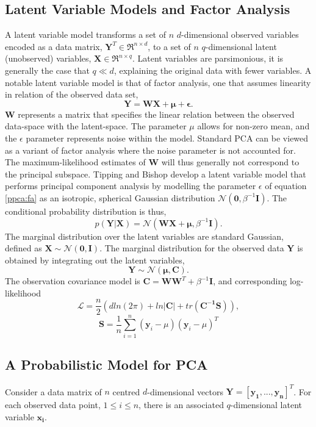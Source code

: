 \documentclass[ %
author={Dillon Keith Diep [INCOMPLETE DRAFT, NOT FOR SUBMISSION]},
supervisor={Dr. Carl Henrik Ek},
degree={MEng},
title={ARt-CG:},
subtitle={Assisted Real-time Content Generation of 3D Hair by Learning Manifolds},
type={Research},
year={2014} ]{dissertation}
\begin{document}
\subsection{Latent Variable Models and Factor Analysis}
A latent variable model transforms a set of $n$ $d$-dimensional observed variables encoded as a data matrix, $\bm{Y}^T\in\Re^{n \times d}$, to a set of $n$ $q$-dimensional latent (unobserved) variables, $\bm{X}\in\Re^{n \times q}$. Latent variables are parsimonious, it is generally the case that $q \ll d$, explaining the original data with fewer variables. A notable latent variable model is that of factor analysis, one that assumes linearity in relation of the observed data set,
\begin{equation} \label{ppca:fa}
\bm{Y=WX+\mu+\epsilon}.
\end{equation}
$\bm{W}$ represents a matrix that specifies the linear relation between the observed data-space with the latent-space.
The parameter $\mu$ allows for non-zero mean, and the $\epsilon$ parameter represents noise within the model. Standard PCA can be viewed as a variant of factor analysis where the noise parameter is not accounted for. The maximum-likelihood estimates of $\bm{W}$ will thus generally not correspond to the principal subspace. Tipping and Bishop develop a latent variable model that performs principal component analysis by modelling the parameter $\epsilon$ of equation \ref{ppca:fa} as an isotropic, spherical Gaussian distribution $\mathcal{N}(\bm{0},\beta^{-1}\bm{I})$. The conditional probability distribution is thus,
\begin{equation} \label{ppca:conditional}
p(\bm{Y|X})=\mathcal{N}(\bm{WX+\mu},\beta^{-1}\bm{I}). 
\end{equation}
The marginal distribution over the latent variables are standard Gaussian, defined as $\bm{X\sim\mathcal{N}(0,I)}$. The marginal distribution for the observed data $\bm{Y}$ is obtained by integrating out the latent variables,
$$\bm{Y}\sim\mathcal{N}\bm{(\mu,C)}.$$
The observation covariance model is $\bm{C=WW}^T+\beta^{-1}\bm{I}$, and corresponding log-likelihood
\begin{equation} \label{ppca:loglikelihood}
\mathcal{L}=\frac{n}{2}(d ln(2\pi)+ln|\bm{C}|+tr(\bm{C^{-1}S})),
\end{equation}
$$\bm{S}=\frac{1}{n}\sum^n_{i=1}(\bm{y}_i-\mu)(\bm{y}_i-\mu)^T$$

\subsection{A Probabilistic Model for PCA}
Consider a data matrix of $n$ centred $d$-dimensional vectors $\bm{Y=[y_1,...,y_n]}^T$.
For each observed data point, $1 \leq i \leq n $, there is an associated $q$-dimensional latent variable $\bm{x_i}$.
\end{document}

